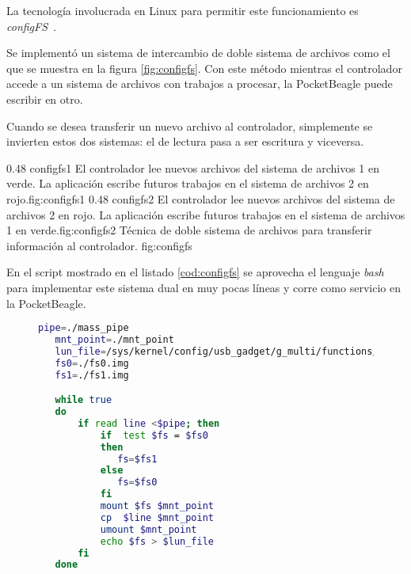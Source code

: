    La tecnología involucrada en Linux para permitir este funcionamiento es \mbox{\textit{configFS} \citep{WEBSITE:configfs}}.\par
   Se implementó un sistema de intercambio de doble sistema de archivos como el que se muestra en la figura \ref{fig:configfs}.
   Con este método mientras el controlador accede a un sistema de archivos con trabajos a procesar, la PocketBeagle puede escribir en otro.\par
   Cuando se desea transferir un nuevo archivo al controlador, simplemente se invierten estos dos sistemas: el de lectura pasa a ser escritura y viceversa.

\subfigab 
   {0.48} {configfs1} {El controlador lee nuevos archivos del sistema de archivos 1 en verde. La aplicación escribe futuros trabajos en el sistema de archivos 2 en rojo.}{fig:configfs1}
   {0.48} {configfs2} {El controlador lee nuevos archivos del sistema de archivos 2 en rojo. La aplicación escribe futuros trabajos en el sistema de archivos 1 en verde.}{fig:configfs2}
   {Técnica de doble sistema de archivos para transferir información al controlador.}
   {fig:configfs}

   En el script mostrado en el listado \ref{cod:configfs} se aprovecha el lenguaje \textit{bash} para implementar este sistema dual en muy pocas líneas y corre como servicio en la PocketBeagle.

\begin{figure}[h]
   \begin{lstlisting}[language=bash,caption={Implementación de doble sistema de archivos conectado con la tecnología configFS. Se aprovecha la potencia de \textit{bash} y se corre como servicio.},label={cod:configfs}]
   pipe=./mass_pipe
   mnt_point=./mnt_point
   lun_file=/sys/kernel/config/usb_gadget/g_multi/functions/mass_storage.usb0/lun.0/file
   fs0=./fs0.img
   fs1=./fs1.img

   while true
   do
       if read line <$pipe; then
           if  test $fs = $fs0
           then
              fs=$fs1
           else
              fs=$fs0
           fi
           mount $fs $mnt_point
           cp  $line $mnt_point
           umount $mnt_point
           echo $fs > $lun_file
       fi
   done
   \end{lstlisting}
\end{figure}


